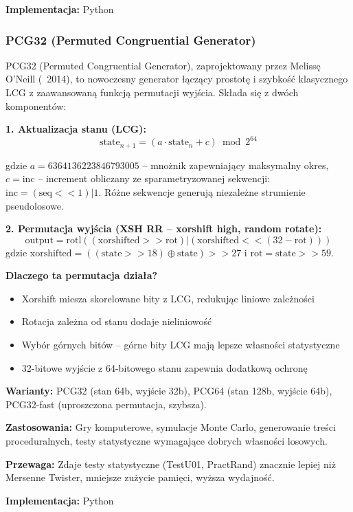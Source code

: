 \documentclass[12pt,a4paper]{article}
\begin{document}
\textbf{Implementacja:} Python

\subsubsection{PCG32 (Permuted Congruential Generator)}

PCG32 (Permuted Congruential Generator), zaprojektowany przez Melissę O'Neill (~2014), to nowoczesny generator łączący prostotę i szybkość klasycznego LCG z zaawansowaną funkcją permutacji wyjścia. Składa się z dwóch komponentów:

\textbf{1. Aktualizacja stanu (LCG):}
$$\text{state}_{n+1} = (a \cdot \text{state}_n + c) \bmod 2^{64}$$

gdzie $a = 6364136223846793005$ – mnożnik zapewniający maksymalny okres, $c = \text{inc}$ – increment obliczany ze sparametryzowanej sekwencji: $\text{inc} = (\text{seq} << 1) | 1$. Różne sekwencje generują niezależne strumienie pseudolosowe.

\textbf{2. Permutacja wyjścia (XSH RR – xorshift high, random rotate):}
$$\text{output} = \text{rotl}((\text{xorshifted} >> \text{rot}) | (\text{xorshifted} << (32 - \text{rot})))$$
gdzie $\text{xorshifted} = ((\text{state} >> 18) \oplus \text{state}) >> 27$ i $\text{rot} = \text{state} >> 59$.

\textbf{Dlaczego ta permutacja działa?}
\begin{itemize}
    \item Xorshift miesza skorelowane bity z LCG, redukując liniowe zależności
    \item Rotacja zależna od stanu dodaje nieliniowość
    \item Wybór górnych bitów – górne bity LCG mają lepsze własności statystyczne
    \item 32-bitowe wyjście z 64-bitowego stanu zapewnia dodatkową ochronę
\end{itemize}

\textbf{Warianty:} PCG32 (stan 64b, wyjście 32b), PCG64 (stan 128b, wyjście 64b), PCG32-fast (uproszczona permutacja, szybsza).

\textbf{Zastosowania:} Gry komputerowe, symulacje Monte Carlo, generowanie treści proceduralnych, testy statystyczne wymagające dobrych własności losowych.

\textbf{Przewaga:} Zdaje testy statystyczne (TestU01, PractRand) znacznie lepiej niż Mersenne Twister, mniejsze zużycie pamięci, wyższa wydajność.

\textbf{Implementacja:} Python
\end{document}

